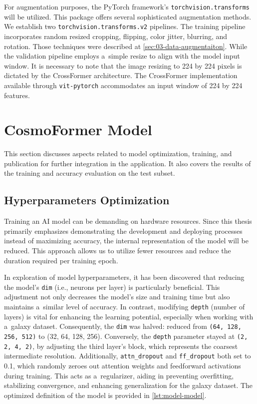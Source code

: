 For augmentation purposes, the PyTorch framework's \texttt{torchvision.transforms} will be utilized. This package offers several sophisticated augmentation methods. We establish two \texttt{torchvision.transforms.v2} pipelines. The training pipeline incorporates random resized cropping, flipping, color jitter, blurring, and rotation. Those techniques were described at \autoref{sec:03-data-augmentaiton}. While the validation pipeline employs a~simple resize to align with the model input window. It is necessary to note that the image resizing to 224 by 224 pixels is dictated by the CrossFormer architecture. The CrossFormer implementation available through \texttt{vit-pytorch} accommodates an input window of 224 by 224 features. 

\section{CosmoFormer Model}

This section discusses aspects related to model optimization, training, and publication for further integration in the application. It also covers the results of the training and accuracy evaluation on the test subset.

\subsection*{Hyperparameters Optimization}
\label{sec:model-optimizations}

Training an AI model can be demanding on hardware resources. Since this thesis primarily emphasizes demonstrating the development and deploying processes instead of maximizing accuracy, the internal representation of the model will be reduced. This approach allows us to utilize fewer resources and reduce the duration required per training epoch.

In exploration of model hyperparameters, it has been discovered that reducing the model's \texttt{dim} (i.e., neurons per layer) is particularly beneficial. This adjustment not only decreases the model's size and training time but also maintains a~similar level of accuracy. In contrast, modifying \texttt{depth} (number of layers) is vital for enhancing the learning potential, especially when working with a~galaxy dataset. Consequently, the \texttt{dim} was halved: reduced from \texttt{(64, 128, 256, 512)} to (32, 64, 128, 256). Conversely, the \texttt{depth} parameter stayed at \texttt{(2, 2, 4, 2)}, by adjusting the third layer's block, which represents the coarsest intermediate resolution. Additionally, \texttt{attn\_dropout} and \texttt{ff\_dropout} both set to 0.1, which randomly zeroes out attention weights and feedforward activations during training. This acts as a~regularizer, aiding in preventing overfitting, stabilizing convergence, and enhancing generalization for the galaxy dataset. The optimized definition of the model is provided in \autoref{lst:model-model}.

